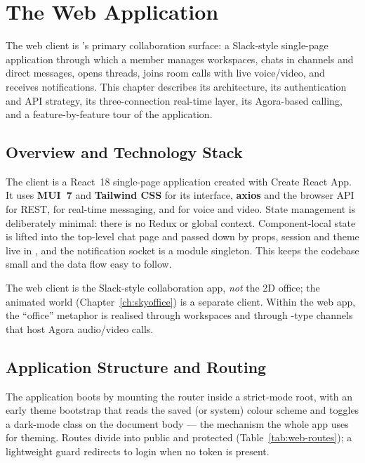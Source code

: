 \chapter{The Web Application}
\label{ch:web}

The web client is \voname{}'s primary collaboration surface: a Slack-style
single-page application through which a member manages workspaces, chats in
channels and direct messages, opens threads, joins room calls with live
voice/video, and receives notifications. This chapter describes its architecture,
its authentication and API strategy, its three-connection real-time layer, its
Agora-based calling, and a feature-by-feature tour of the application.

\section{Overview and Technology Stack}

The client is a React~18 single-page application created with Create React App.
It uses \textbf{MUI~7} and \textbf{Tailwind CSS} for its interface,
\textbf{axios} and the browser  API for REST, \textbf{} for real-time messaging, and \textbf{} for
voice and video. State management is deliberately minimal: there is no Redux or
global context. Component-local state is lifted into the top-level chat page and
passed down by props, session and theme live in , and the
notification socket is a module singleton. This keeps the codebase small and the
data flow easy to follow.

\begin{notebox}
The web client is the Slack-style collaboration app, \emph{not} the 2D office;
the animated world (Chapter~\ref{ch:skyoffice}) is a separate client. Within the
web app, the ``office'' metaphor is realised through workspaces and through
-type channels that host Agora audio/video calls.
\end{notebox}

\section{Application Structure and Routing}

The application boots by mounting the router inside a strict-mode root, with an
early theme bootstrap that reads the saved (or system) colour scheme and toggles
a dark-mode class on the document body --- the mechanism the whole app uses for
theming. Routes divide into public and protected (Table~\ref{tab:web-routes}); a
lightweight  guard redirects to login when no token is present.

